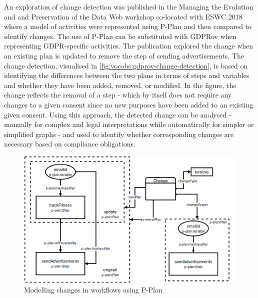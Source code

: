 An exploration of change detection was published in the Managing the Evolution and and Preservation of the Data Web workshop co-located with ESWC 2018 \cite{pandit_gdpr-driven_2018} where a model of activities were represented using P-Plan and then compared to identify changes. The use of P-Plan can be substituted with GDPRov when representing GDPR-specific activities.
The publication explored the change when an existing plan is updated to remove the step of sending advertisements. The change detection, visualised in \autoref{fig:vocabs:gdprov-change-detection}, is based on identifying the differences between the two plans in terms of steps and variables and whether they have been added, removed, or modified.
In the figure, the change reflects the removal of a step - which by itself does not require any changes to a given consent since no new purposes have been added to an existing given consent.
Using this approach, the detected change can be analysed - manually for complex and legal interpretations while automatically for simpler or simplified graphs - and used to identify whether corresponding changes are necessary based on compliance obligations.
\begin{figure}[htbp]
    \centering
    \includegraphics[width=\textwidth]{img/GDPRov-change-detection.png}
    \caption{Modelling changes in workflows using P-Plan \cite{pandit_gdpr-driven_2018}}
    \label{fig:vocabs:gdprov-change-detection}
\end{figure}

